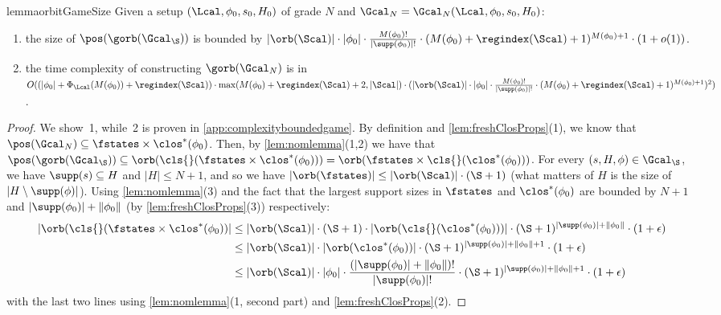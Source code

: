 \begin{restatable}{lemma}{orbitGameSize}\label{lem:orbitGameSize}\label{lem:fnomparsize}
  Given a setup $(\Lcal,\phi_0,s_0,H_0)$ of grade $N$ and $\Gcal_N=\Gcal_N(\Lcal, \phi_0, s_0, H_0)$:
  \begin{enumerate}
    \item the size of $\pos(\gorb(\Gcal_\S))$ is bounded by
    $
        |\orb(\Scal)| \cdot|\phi_0|\cdot \frac{M({\phi_0})!}{|\supp(\phi_0)|!}\cdot (M(\phi_0)+\regindex(\Scal) + 1)^{M(\phi_0) + 1}\cdot(1+o(1))
    $.
    \item the time complexity of constructing $\gorb(\Gcal_N)$ is in
$ O(   (|\phi_0| + \Phi_\Lcal(M(\phi_0)) +\regindex(\Scal))
    \cdot
    \max(M(\phi_0)+\regindex(\Scal) + 2, |\Scal|
    )  \cdot 
    (|\orb(\Scal)| \cdot|\phi_0|\cdot \frac{M(\phi_0)!}{|\supp(\phi_0)|!}\cdot (M(\phi_0)+\regindex(\Scal) + 1)^{M(\phi_0) + 1})
    ^2)$.
\end{enumerate}
\end{restatable}
\begin{proof}  We show~1, while~2 is proven in \cref{app:complexityboundedgame}.
    By definition and \cref{lem:freshClosProps}(1), we know that $\pos(\Gcal_N) \subseteq \fstates \times \clos^*(\phi_0)$.
        Then, by \cref{lem:nomlemma}(1,2) we have that $\pos(\gorb(\Gcal_\S)) \subseteq \orb(\cls{}(\fstates \times \clos^*(\phi_0))) = \orb(\fstates \times \cls{}(\clos^*(\phi_0)))$.
    For every $(s, H, \phi) \in \Gcal_\S$, we have $\supp(s) \subseteq H$ and $|H|\leq N+1$, and so we have $|\orb(\fstates)| \le |\orb(\Scal)| \cdot (\S + 1)$ (what matters of $H$ is the size of $|H\setminus\supp(\phi)|$).
    Using \cref{lem:nomlemma}(3) and the fact that the largest support sizes in $\fstates$ and $\clos^*(\phi_0)$ are bounded by $N+1$ and $|\supp(\phi_0)| + \|\phi_0\|$ (by \cref{lem:freshClosProps}(3)) respectively:
    \begin{align*}
        |\orb(\cls{}(\fstates \times \clos^*(\phi_0))| &\le |\orb(\Scal)| \cdot (\S + 1) \cdot|\orb(\cls{}(\clos^*(\phi_0)))|\cdot (\S + 1)^{|\supp(\phi_0)| + \|\phi_0\|}\cdot(1 + \epsilon) 
        \\ &\le |\orb(\Scal)| \cdot|\orb(\clos^*(\phi_0))|\cdot (\S + 1)^{|\supp(\phi_0)| + \|\phi_0\| + 1}\cdot(1+\epsilon)
\\
        &\le |\orb(\Scal)| \cdot|\phi_0|\cdot \frac{(|\supp(\phi_0)|+\|\phi_0\|)!}{|\supp(\phi_0)|!}\cdot (\S + 1)^{|\supp(\phi_0)| + \|\phi_0\| + 1}\cdot(1+\epsilon)
            \end{align*}
    with the last two lines using \cref{lem:nomlemma}(1, second part) and \cref{lem:freshClosProps}(2).
\end{proof}



